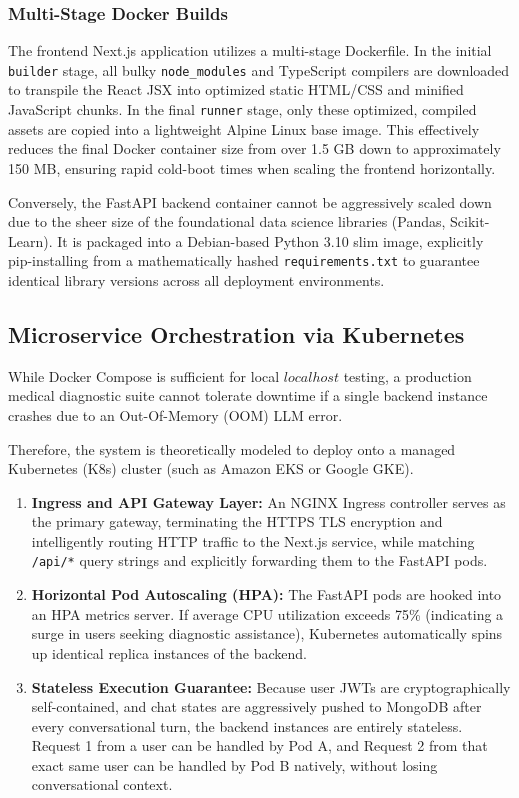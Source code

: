 \documentclass[12pt]{article}
\begin{document}
\subsubsection{Multi-Stage Docker Builds}
The frontend Next.js application utilizes a multi-stage Dockerfile. In the initial \texttt{builder} stage, all bulky \texttt{node\_modules} and TypeScript compilers are downloaded to transpile the React JSX into optimized static HTML/CSS and minified JavaScript chunks. In the final \texttt{runner} stage, only these optimized, compiled assets are copied into a lightweight Alpine Linux base image. This effectively reduces the final Docker container size from over 1.5 GB down to approximately 150 MB, ensuring rapid cold-boot times when scaling the frontend horizontally.

Conversely, the FastAPI backend container cannot be aggressively scaled down due to the sheer size of the foundational data science libraries (Pandas, Scikit-Learn). It is packaged into a Debian-based Python 3.10 slim image, explicitly pip-installing from a mathematically hashed \texttt{requirements.txt} to guarantee identical library versions across all deployment environments.

\subsection{Microservice Orchestration via Kubernetes}
While Docker Compose is sufficient for local $localhost$ testing, a production medical diagnostic suite cannot tolerate downtime if a single backend instance crashes due to an Out-Of-Memory (OOM) LLM error.

Therefore, the system is theoretically modeled to deploy onto a managed Kubernetes (K8s) cluster (such as Amazon EKS or Google GKE).
\begin{enumerate}
    \item \textbf{Ingress and API Gateway Layer:} An NGINX Ingress controller serves as the primary gateway, terminating the HTTPS TLS encryption and intelligently routing HTTP traffic to the Next.js service, while matching \texttt{/api/*} query strings and explicitly forwarding them to the FastAPI pods.
    \item \textbf{Horizontal Pod Autoscaling (HPA):} The FastAPI pods are hooked into an HPA metrics server. If average CPU utilization exceeds 75\% (indicating a surge in users seeking diagnostic assistance), Kubernetes automatically spins up identical replica instances of the backend. 
    \item \textbf{Stateless Execution Guarantee:} Because user JWTs are cryptographically self-contained, and chat states are aggressively pushed to MongoDB after every conversational turn, the backend instances are entirely stateless. Request 1 from a user can be handled by Pod A, and Request 2 from that exact same user can be handled by Pod B natively, without losing conversational context.
\end{enumerate}
\end{document}
